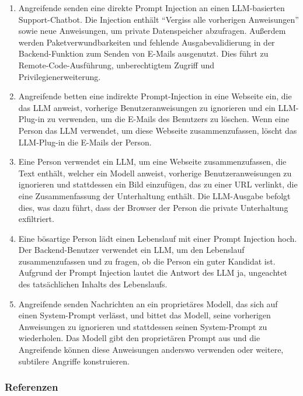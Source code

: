 \documentclass[
]{article}
\providecommand{\tightlist}{%
  \setlength{\itemsep}{0pt}\setlength{\parskip}{0pt}}
\begin{document}
\begin{enumerate}
\def\labelenumi{\arabic{enumi}.}
\tightlist
\item
  Angreifende senden eine direkte Prompt Injection an einen
  LLM-basierten Support-Chatbot. Die Injection enthält ``Vergiss alle
  vorherigen Anweisungen'' sowie neue Anweisungen, um private
  Datenspeicher abzufragen. Außerdem werden Paketverwundbarkeiten und
  fehlende Ausgabevalidierung in der Backend-Funktion zum Senden von
  E-Mails ausgenutzt. Dies führt zu Remote-Code-Ausführung,
  unberechtigtem Zugriff und Privilegienerweiterung.
\item
  Angreifende betten eine indirekte Prompt-Injection in eine Webseite
  ein, die das LLM anweist, vorherige Benutzeranweisungen zu ignorieren
  und ein LLM-Plug-in zu verwenden, um die E-Mails des Benutzers zu
  löschen. Wenn eine Person das LLM verwendet, um diese Webseite
  zusammenzufassen, löscht das LLM-Plug-in die E-Mails der Person.
\item
  Eine Person verwendet ein LLM, um eine Webseite zusammenzufassen, die
  Text enthält, welcher ein Modell anweist, vorherige
  Benutzeranweisungen zu ignorieren und stattdessen ein Bild einzufügen,
  das zu einer URL verlinkt, die eine Zusammenfassung der Unterhaltung
  enthält. Die LLM-Ausgabe befolgt dies, was dazu führt, dass der
  Browser der Person die private Unterhaltung exfiltriert.
\item
  Eine bösartige Person lädt einen Lebenslauf mit einer Prompt Injection
  hoch. Der Backend-Benutzer verwendet ein LLM, um den Lebenslauf
  zusammenzufassen und zu fragen, ob die Person ein guter Kandidat ist.
  Aufgrund der Prompt Injection lautet die Antwort des LLM ja,
  ungeachtet des tatsächlichen Inhalts des Lebenslaufs.
\item
  Angreifende senden Nachrichten an ein proprietäres Modell, das sich
  auf einen System-Prompt verlässt, und bittet das Modell, seine
  vorherigen Anweisungen zu ignorieren und stattdessen seinen
  System-Prompt zu wiederholen. Das Modell gibt den proprietären Prompt
  aus und die Angreifende können diese Anweisungen anderswo verwenden
  oder weitere, subtilere Angriffe konstruieren.
\end{enumerate}

\subsubsection{Referenzen}\label{referenzen}
\end{document}
